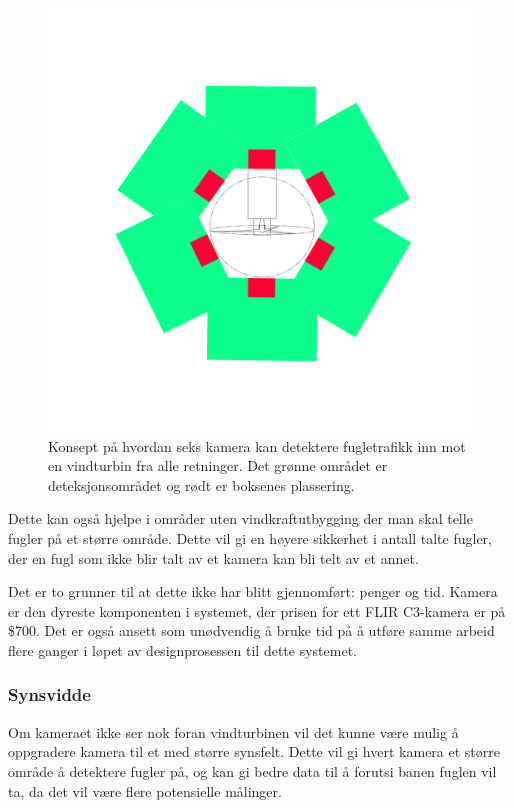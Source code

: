 \begin{figure}[!htbp]
\begin{minipage}[b]{0.45\textwidth}
    \includegraphics[width=\textwidth]{konklusjon/Nettverk.png}
    \caption{Konsept på hvordan seks kamera kan detektere fugletrafikk inn mot en vindturbin fra alle retninger. Det grønne området er deteksjonsområdet og rødt er boksenes plassering.}
    \label{fig:fraoven}
  \end{minipage}
\end{figure}





Dette kan også hjelpe i områder uten vindkraftutbygging der man skal telle fugler på et større område. Dette vil gi en høyere sikkerhet i antall talte fugler, der en fugl som ikke blir talt av et kamera kan bli telt av et annet. 

Det er to grunner til at dette ikke har blitt gjennomført: penger og tid. Kamera er den dyreste komponenten i systemet, der prisen for ett FLIR C3-kamera er på \$700. Det er også ansett som unødvendig å bruke tid på å utføre samme arbeid flere ganger i løpet av designprosessen til dette systemet.

\subsubsection{Synsvidde}
Om kameraet ikke ser nok foran vindturbinen vil det kunne være mulig å oppgradere kamera til et med større synsfelt. Dette vil gi hvert kamera et større område å detektere fugler på, og kan gi bedre data til å forutsi banen fuglen vil ta, da det vil være flere potensielle målinger.

